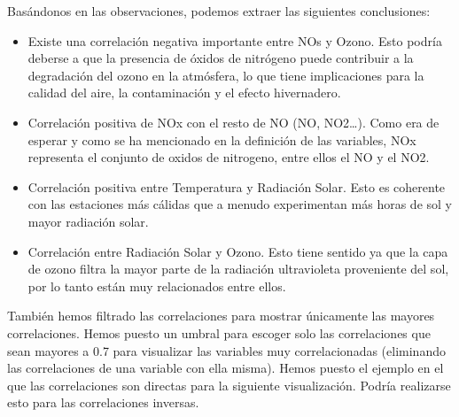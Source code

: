 \documentclass[notspecified,article,submit,moreauthors,pdftex]{Definitions/mdpi}
\begin{document}
Basándonos en las observaciones, podemos extraer las siguientes
conclusiones:

\begin{itemize}
\item
  Existe una correlación negativa importante entre NOs y Ozono. Esto
  podría deberse a que la presencia de óxidos de nitrógeno puede
  contribuir a la degradación del ozono en la atmósfera, lo que tiene
  implicaciones para la calidad del aire, la contaminación y el efecto
  hivernadero.
\item
  Correlación positiva de NOx con el resto de NO (NO, NO2\ldots). Como
  era de esperar y como se ha mencionado en la definición de las
  variables, NOx representa el conjunto de oxidos de nitrogeno, entre
  ellos el NO y el NO2.
\item
  Correlación positiva entre Temperatura y Radiación Solar. Esto es
  coherente con las estaciones más cálidas que a menudo experimentan más
  horas de sol y mayor radiación solar.
\item
  Correlación entre Radiación Solar y Ozono. Esto tiene sentido ya que
  la capa de ozono filtra la mayor parte de la radiación ultravioleta
  proveniente del sol, por lo tanto están muy relacionados entre ellos.
\end{itemize}

También hemos filtrado las correlaciones para mostrar únicamente las
mayores correlaciones. Hemos puesto un umbral para escoger solo las
correlaciones que sean mayores a 0.7 para visualizar las variables muy
correlacionadas (eliminando las correlaciones de una variable con ella
misma). Hemos puesto el ejemplo en el que las correlaciones son directas
para la siguiente visualización. Podría realizarse esto para las
correlaciones inversas.
\end{document}
